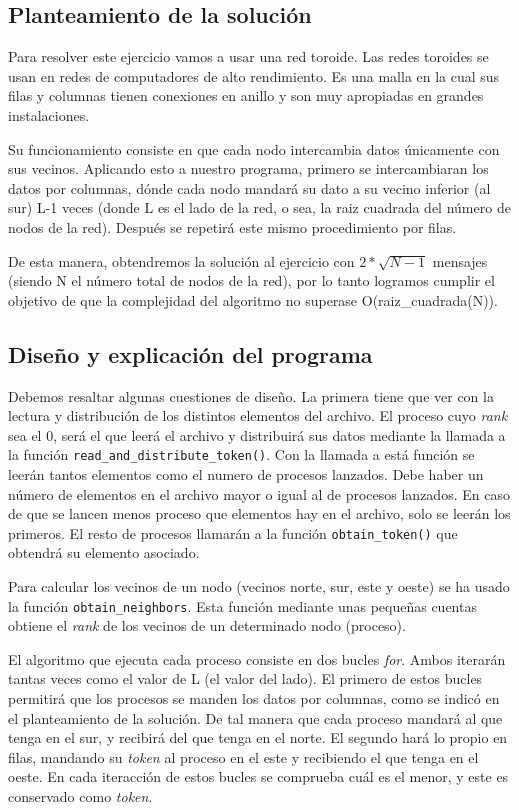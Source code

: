 \documentclass[11pt]{article}
\begin{document}
\subsection{Planteamiento de la solución}
Para resolver este ejercicio vamos a usar una red toroide. Las redes toroides se usan en redes de computadores de alto rendimiento. Es una malla en la cual sus filas y columnas tienen conexiones en anillo y son muy apropiadas en grandes instalaciones. 

Su funcionamiento consiste en que cada nodo intercambia datos únicamente con sus vecinos. Aplicando esto a nuestro programa, primero se intercambiaran los datos por columnas, dónde cada nodo mandará su dato a su vecino inferior (al sur) L-1 veces (donde L es el lado de la red, o sea, la raiz cuadrada del número de nodos de la red). Después se repetirá este mismo procedimiento por filas.

De esta manera, obtendremos la solución al ejercicio con $2*\sqrt{N-1}$ mensajes (siendo N el número total de nodos de la red), por lo tanto logramos cumplir el objetivo de que la complejidad del algoritmo no superase O(raiz\_cuadrada(N)).


\subsection{Diseño y explicación del programa}
Debemos resaltar algunas cuestiones de diseño. La primera tiene que ver con la lectura y distribución de los distintos elementos del archivo. El proceso cuyo \emph{rank} sea el 0, será el que leerá el archivo y distribuirá sus datos mediante la llamada a la función \texttt{read\_and\_distribute\_token()}. Con la llamada a está función se leerán tantos elementos como el numero de procesos lanzados. Debe haber un número de elementos en el archivo mayor o igual al de procesos lanzados. En caso de que se lancen menos proceso que elementos hay en el archivo, solo se leerán los primeros. El resto de procesos llamarán a la función \texttt{obtain\_token()} que obtendrá su elemento asociado.

Para calcular los vecinos de un nodo (vecinos norte, sur, este y oeste) se ha usado la función \texttt{obtain\_neighbors}. Esta función mediante unas pequeñas cuentas obtiene el \emph{rank} de los vecinos de un determinado nodo (proceso).

El algoritmo que ejecuta cada proceso consiste en dos bucles \emph{for}. Ambos iterarán tantas veces como el valor de L (el valor del lado). El primero de estos bucles permitirá que los procesos se manden los datos por columnas, como se indicó en el planteamiento de la solución. De tal manera que cada proceso mandará al que tenga en el sur, y recibirá del que tenga en el norte. El segundo hará lo propio en filas, mandando su \emph{token} al proceso en el este y recibiendo el que tenga en el oeste. En cada iteracción de estos bucles se comprueba cuál es el menor, y este es conservado como \emph{token}. 
\end{document}
